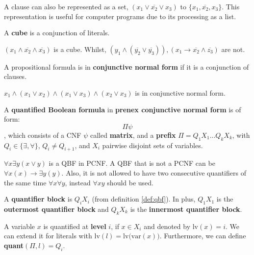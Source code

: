 A clause can also be represented as a set, $(x_1 \lor \overline{x_2} \lor x_3)$ to $\{ x_1, \overline{x_2}, x_3 \}$. This representation is useful for computer programs due to its processing as a list.

\begin{definition}
    A \textbf{cube} is a conjunction of literals.
\end{definition}

\begin{example}
    $(x_1 \land \overline{x_2} \land \overline{x_3})$ is a cube. Whilst, $(y_1 \land (\overline{y_2} \lor \overline{y_3})), (x_1 \to \overline{x_2} \land \overline{z_3})$ are not.
\end{example}

\begin{definition}
    A propositional formula is in \textbf{conjunctive normal form} if it is a conjunction of clauses.
\end{definition}

\begin{example}
    $x_1 \land (x_1 \lor x_2) \land (x_1 \lor x_3) \land (x_2 \lor x_3)$ is in conjunctive normal form.
\end{example}

\begin{definition}\label{def:qbf}
    A \textbf{quantified Boolean formula} in \textbf{prenex conjunctive normal form} is of form:
    \[ \Pi\psi \]
    , which consists of a CNF $\psi$ called \textbf{matrix}, and a \textbf{prefix} $\Pi = Q_1X_1\dots Q_kX_k$, with $Q_i \in \{ \exists, \forall \}$, $Q_i \not= Q_{i+1}$, and $X_i$ pairwise disjoint sets of variables.
\end{definition}

\begin{example}
    $\forall x \exists y (x \lor y)$ is a QBF in PCNF. A QBF that is not a PCNF can be $\forall x (x) \to \exists y (y)$. Also, it is not allowed to have two consecutive quantifiers of the same time $\forall x \forall y$, instead $\forall x y$ should be used.
\end{example}

\begin{definition}
    A \textbf{quantifier block} is $Q_iX_i$ (from definition \ref{def:qbf}). In plus, $Q_1X_1$ is the \textbf{outermost quantifier block} and $Q_kX_k$ is the \textbf{innermost quantifier block}.

    A variable $x$ is quantified at \textbf{level} $i$, if $x \in X_i$ and denoted by lv$(x) = i$. We can extend it for literals with lv$(l) = \text{lv(var}(x))$. Furthermore, we can define \textbf{quant}$(\Pi,l) = Q_i$.
\end{definition}

